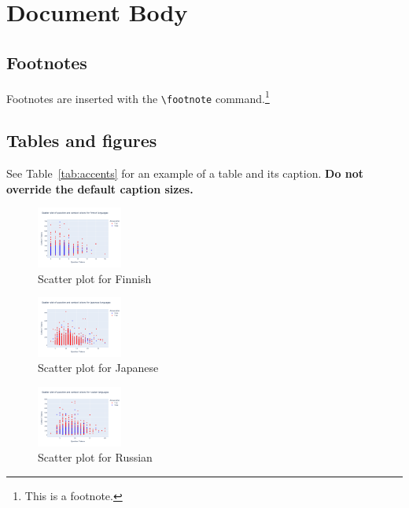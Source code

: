 \documentclass[11pt]{article}
\begin{document}
\section{Document Body}

\subsection{Footnotes}

Footnotes are inserted with the \verb|\footnote| command.\footnote{This is a footnote.}

\subsection{Tables and figures}

See Table~\ref{tab:accents} for an example of a table and its caption.
\textbf{Do not override the default caption sizes.}

\begin{figure}[ht]
    \centering
    \includegraphics[width=0.25\textwidth]{week1_c_scatter_fi.png}
    \caption{Scatter plot for Finnish}
    \label{fig:scatter_week1_c_fi}
\end{figure}

\begin{figure}[ht]
    \centering
    \includegraphics[width=0.25\textwidth]{week1_c_scatter_ja.png}
    \caption{Scatter plot for Japanese}
    \label{fig:scatter_week1_c_ja}
\end{figure}

\begin{figure}[ht]
    \centering
    \includegraphics[width=0.25\textwidth]{week1_c_scatter_ru.png}
    \caption{Scatter plot for Russian}
    \label{fig:scatter_week1_c_ru}
\end{figure}
\end{document}
